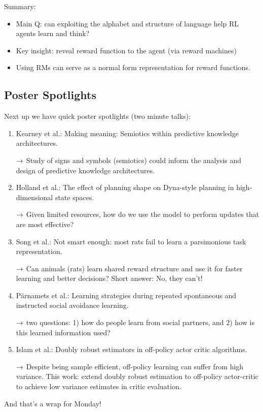 Summary:
\begin{itemize}
    \item Main Q: can exploiting the alphabet and structure of language help RL agents learn and think?
    \item Key insight: reveal reward function to the agent (via reward machines)
    \item Using RMs can serve as a normal form representation for reward functions.
\end{itemize}

\spacerule


\subsection{Poster Spotlights}

Next up we have quick poster spotlights (two minute talks):
\begin{enumerate}
\item Kearney et al.: Making meaning: Semiotics within predictive
knowledge architectures.

$\rightarrow$ Study of signs and symbols (semiotics) could inform the analysis and design of predictive knowledge architectures.

\item Holland et al.: The effect of planning shape on Dyna-style
planning in high-dimensional state spaces.

$\rightarrow$ Given limited resources, how do we use the model to perform updates that are most effective?

\item Song et al.: Not smart enough: most rats fail to learn a
parsimonious task representation.

$\rightarrow$ Can animals (rats) learn shared reward structure and use it for faster learning and better decisions? Short answer: No, they can't!

\item P{\" a}rnamets et al.: Learning strategies during repeated
spontaneous and instructed social avoidance learning.

$\rightarrow$ two questions: 1) how do people learn from social partners, and 2) how is this learned information used?

\item Islam et al.: Doubly robust estimators in off-policy actor critic algorithms.

$\rightarrow$ Despite being sample efficient, off-policy learning can suffer from high variance. This work: extend doubly robust estimation to off-policy actor-critic to achieve low variance estimates in critic evaluation.

\end{enumerate}


And that's a wrap for Monday!


\spacerule



